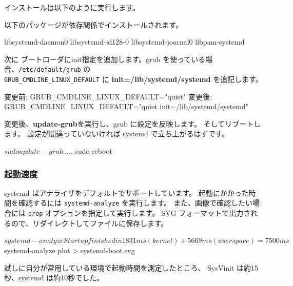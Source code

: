 \documentclass[mingoth,a4paper]{jsarticle}
\begin{document}

インストールは以下のように実行します。


以下のパッケージが依存関係でインストールされます。
\begin{commandline}
libsystemd-daemon0
libsystemd-id128-0
libsystemd-journal0
libpam-systemd
\end{commandline}

次に ブートローダにinit指定を追加します。grub を使っている場合、\texttt{/etc/default/grub} の\\
\texttt{GRUB\_CMDLINE\_LINUX\_DEFAULT} に {\bf init=/lib/systemd/systemd} を追記します。 

\begin{commandline}
変更前:
GRUB_CMDLINE_LINUX_DEFAULT="quiet"
変更後:
GRUB_CMDLINE_LINUX_DEFAULT="quiet init=/lib/systemd/systemd"
\end{commandline} 

変更後、{\bf update-grub}を実行し、grub に設定を反映します。
そしてリブートします。
設定が間違っていないければ systemd で立ち上がるはずです。

\begin{commandline}
$ sudo update-grub
.....
$ sudo reboot 
\end{commandline}

\subsubsection{起動速度}

systemd はアナライザをデフォルトでサポートしています。
起動にかかった時間を確認するには \texttt{systemd-analyze} を実行します。
また、画像で確認したい場合には \texttt{prop} オプションを指定して実行します。
SVG フォーマットで出力されるので、リダイレクトしてファイルに保存します。

\begin{commandline}
$ systemd-analyze 
Startup finished in 1831ms (kernel) + 5669ms (userspace) = 7500ms
$ systemd-analyze plot > systemd-boot.svg
\end{commandline}

試しに自分が常用している環境で起動時間を測定したところ、
SysVinit は約15秒、systemd は約10秒でした。 
\end{document}
